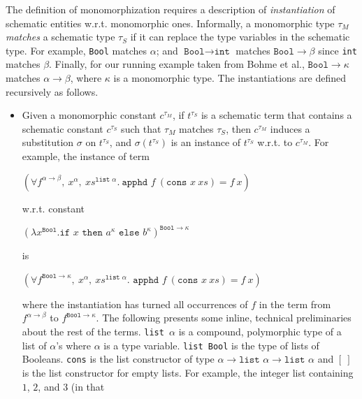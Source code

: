 \documentclass[11pt]{article}
\begin{document}
	The definition of monomorphization 
	requires a description of 
	\textit{instantiation} of schematic 
	entities w.r.t. 
	monomorphic ones.
	Informally, a monomorphic type 
	$\tau_M$ \textit{matches} a schematic 
	type $\tau_S$ if it can replace the 
	type variables in the schematic 
	type. For example, \texttt{Bool} 
	matches $\alpha$; and $\texttt{Bool} 
	\to \texttt{int}$ matches 
	$\texttt{Bool} \to \beta$
	since \texttt{int} matches 
	$\beta$. Finally, for our running 
	example taken from Bohme et al., 
	${\texttt{Bool} \to \kappa}$
	matches $\alpha \to \beta$,
	where $\kappa$ is a monomorphic
	type. The instantiations are 
	defined recursively as follows.
	\begin{itemize}
	\item Given a monomorphic constant 
		$c^{\tau_M}$,  if $t^{\tau_S}$ is a 
		schematic term that contains a 
		schematic constant $c^{\tau_S}$ 
		such that $\tau_M$ matches 
		$\tau_S$, then $c^{\tau_M}$ induces 
		a substitution $\sigma$ on $t^{\tau_S}$, 
		and $\sigma(t^{\tau_S})$ is an instance of 
		$t^{\tau_S}$ w.r.t. to $c^{\tau_M}$. 
		For example, the instance of term
		\begin{center}
			$(\forall f^{\alpha \to \beta},\ 
			x^{\alpha},\ xs^{\texttt{list }
				\alpha}.\ \texttt{apphd }f\ 
			(\texttt{cons }x\ xs) = f\ x)$
		\end{center} 
		w.r.t. constant
		\begin{center}
			$(\lambda x^{\texttt{Bool}}.
			\texttt{if }x\texttt{ then }
			a^{\kappa} \texttt{ else }
			b^{\kappa})^{\texttt{Bool} \to 
				\kappa}$ 
		\end{center}
		is
		\begin{center}
			$(\forall f^{\texttt{Bool} 
				\to \kappa},\ x^{\alpha},\ 
			xs^{\texttt{list }\alpha}. 
			\texttt{ apphd }f\ (\texttt{cons }
			x \ xs) = f\ x)$
		\end{center}
		where the instantiation 
		has turned all occurrences of $f$ 
		in the term from $f^{\alpha \to \beta}$ 
		to $f^{\texttt{Bool} \to \kappa}$.
		The following presents some inline, 
		technical preliminaries about 
		the rest of the terms.
		\texttt{list $\alpha$} is a compound,
		polymorphic type of a list of 
		$\alpha$'s where $\alpha$ is a type 
		variable. \texttt{list Bool} is the 
		type of lists of Booleans. \texttt{cons} 
		is the list constructor of type 
		$\alpha \to \texttt{list }\alpha \to 
		\texttt{list }\alpha$ and $[\ ]$ is 
		the list constructor for empty lists. 
		For example, the integer list 
		containing $1$, $2$, and $3$ (in that 

\end{itemize}
\end{document}

